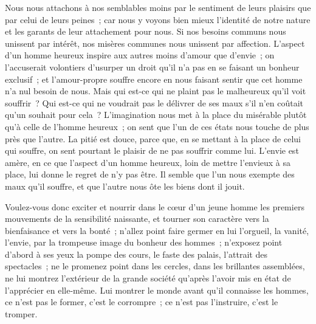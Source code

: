 
{Nous nous attachons à nos semblables moins par le sentiment de leurs plaisirs que par celui de leurs peines~; car nous y voyons bien mieux l'identité de notre nature et les garants de leur attachement pour nous. Si nos besoins communs nous unissent par intérêt, nos misères communes nous unissent par affection. L'aspect d'un homme heureux inspire aux autres moins d'amour que d'envie~; on l'accuserait volontiers d'usurper un droit qu'il n'a pas en se faisant un bonheur exclusif~; et l'amour-propre souffre encore en nous faisant sentir que cet homme n'a nul besoin de nous. Mais qui est-ce qui ne plaint pas le malheureux qu'il voit souffrir~? Qui est-ce qui ne voudrait pas le délivrer de ses maux s'il n'en coûtait qu'un souhait pour cela~? L'imagination nous met à la place du misérable plutôt qu'à celle de l'homme heureux~; on sent que l'un de ces états nous touche de plus près que l'autre. La pitié est douce, parce que, en se mettant à la place de celui qui souffre, on sent pourtant le plaisir de ne pas souffrir comme lui. L'envie est amère, en ce que l'aspect d'un homme heureux, loin de mettre l'envieux à sa place, lui donne le regret de n'y pas être. Il semble que l'un nous exempte des maux qu'il souffre, et que l'autre nous ôte les biens dont il jouit.

Voulez-vous donc exciter et nourrir dans le cœur d'un jeune homme les premiers mouvements de la sensibilité naissante, et tourner son caractère vers la bienfaisance et vers la bonté~; n'allez point faire germer en lui l'orgueil, la vanité, l'envie, par la trompeuse image du bonheur des hommes~; n'exposez point d'abord à ses yeux la pompe des cours, le faste des palais, l'attrait des spectacles~; ne le promenez point dans les cercles, dans les brillantes assemblées, ne lui montrez l'extérieur de la grande société qu'après l'avoir mis en état de l'apprécier en elle-même. Lui montrer le monde avant qu'il connaisse les hommes, ce n'est pas le former, c'est le corrompre~; ce n'est pas l'instruire, c'est le tromper.
}

